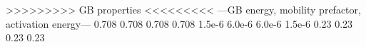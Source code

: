 >>>>>>>>> GB properties <<<<<<<<<
---GB energy, mobility prefactor, activation energy---
0.708 0.708
0.708 0.708
1.5e-6 6.0e-6
6.0e-6 1.5e-6
0.23	0.23
0.23	0.23

